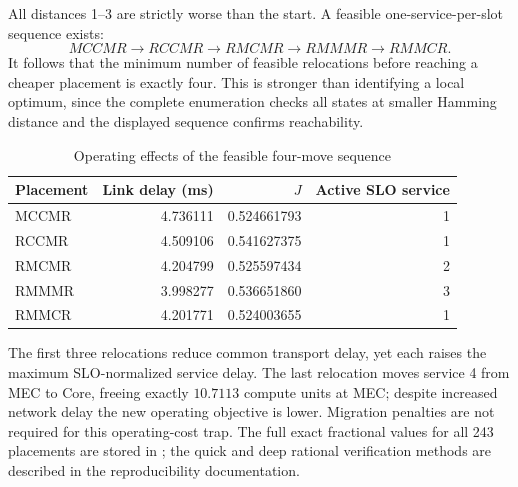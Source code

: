 \documentclass[10pt,a4paper]{article}
\begin{document}
All distances 1--3 are strictly worse than the start. A feasible one-service-per-slot sequence exists:
\[MCCMR\to RCCMR\to RMCMR\to RMMMR\to RMMCR.\]
It follows that the minimum number of feasible relocations before reaching a cheaper placement is exactly four. This is stronger than identifying a local optimum, since the complete enumeration checks all states at smaller Hamming distance and the displayed sequence confirms reachability.
\begin{table}[h]\centering\small
\caption{Operating effects of the feasible four-move sequence}\label{tab:route}
\begin{tabular}{@{}lrrr@{}}\toprule
Placement & Link delay (ms) & $J$ & Active SLO service\\\midrule
MCCMR &4.736111&0.524661793&1\\
RCCMR &4.509106&0.541627375&1\\
RMCMR &4.204799&0.525597434&2\\
RMMMR &3.998277&0.536651860&3\\
RMMCR &4.201771&0.524003655&1\\\bottomrule
\end{tabular}\end{table}
The first three relocations reduce common transport delay, yet each raises the maximum SLO-normalized service delay. The last relocation moves service 4 from MEC to Core, freeing exactly $10.7113$ compute units at MEC; despite increased network delay the new operating objective is lower. Migration penalties are not required for this operating-cost trap. The full exact fractional values for all 243 placements are stored in ; the quick and deep rational verification methods are described in the reproducibility documentation.
\end{document}
